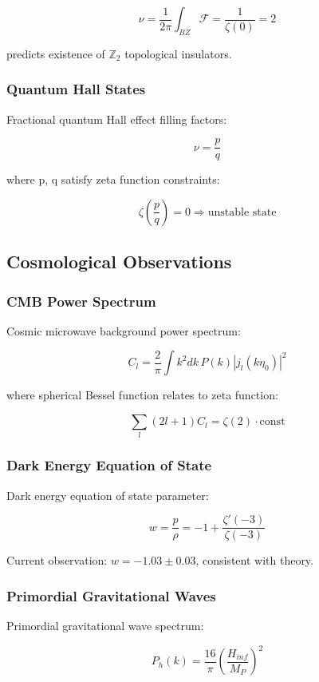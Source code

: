 \documentclass[12pt,a4paper]{article}
\begin{document}
$$\nu = \frac{1}{2\pi} \int_{BZ} \mathcal{F} = \frac{1}{\zeta(0)} = 2$$

predicts existence of $\mathbb{Z}_2$ topological insulators.

\subsubsection{Quantum Hall States}

Fractional quantum Hall effect filling factors:

$$\nu = \frac{p}{q}$$

where p, q satisfy zeta function constraints:

$$\zeta\left(\frac{p}{q}\right) = 0 \Rightarrow \text{unstable state}$$

\subsection{Cosmological Observations}

\subsubsection{CMB Power Spectrum}

Cosmic microwave background power spectrum:

$$C_l = \frac{2}{\pi} \int k^2 dk \, P(k) |j_l(k\eta_0)|^2$$

where spherical Bessel function relates to zeta function:

$$\sum_{l} (2l+1) C_l = \zeta(2) \cdot \text{const}$$

\subsubsection{Dark Energy Equation of State}

Dark energy equation of state parameter:

$$w = \frac{p}{\rho} = -1 + \frac{\zeta'(-3)}{\zeta(-3)}$$

Current observation: $w = -1.03 \pm 0.03$, consistent with theory.

\subsubsection{Primordial Gravitational Waves}

Primordial gravitational wave spectrum:

$$P_h(k) = \frac{16}{\pi} \left(\frac{H_{inf}}{M_P}\right)^2$$
\end{document}
